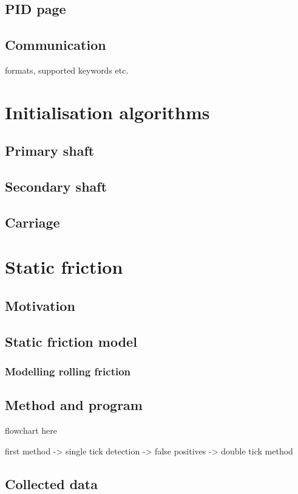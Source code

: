 \documentclass[12pt]{article}
\begin{document}
\subsection{PID page}

\subsection{Communication}
formats, supported keywords etc.


\section{Initialisation algorithms}
\subsection{Primary shaft}
\subsection{Secondary shaft}
\subsection{Carriage}

\section{Static friction}
\subsection{Motivation}

\subsection{Static friction model}
\subsubsection{Modelling rolling friction}
\subsection{Method and program}

flowchart here

first method -> single tick detection -> false positives -> double tick method


\subsection{Collected data}
\end{document}
